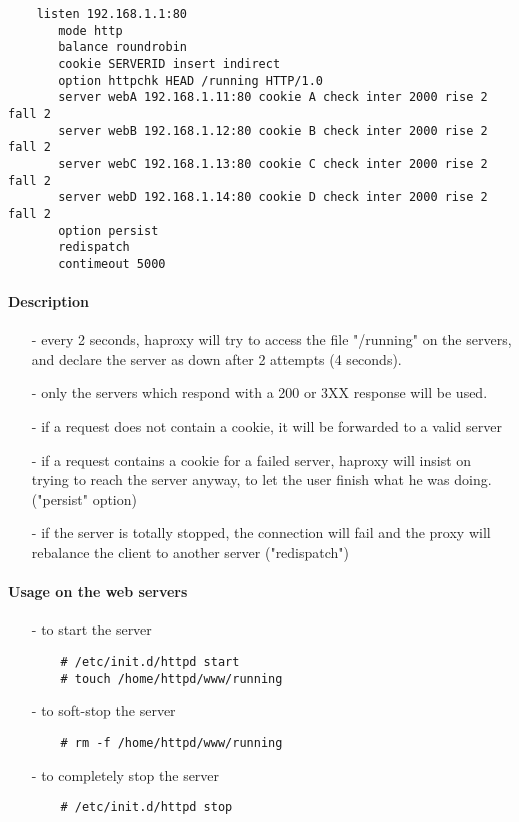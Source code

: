 \begin{verbatim}       
    listen 192.168.1.1:80
       mode http
       balance roundrobin
       cookie SERVERID insert indirect
       option httpchk HEAD /running HTTP/1.0
       server webA 192.168.1.11:80 cookie A check inter 2000 rise 2 fall 2
       server webB 192.168.1.12:80 cookie B check inter 2000 rise 2 fall 2
       server webC 192.168.1.13:80 cookie C check inter 2000 rise 2 fall 2
       server webD 192.168.1.14:80 cookie D check inter 2000 rise 2 fall 2
       option persist
       redispatch
       contimeout 5000
\end{verbatim}

\paragraph{Description}

\begin{itemize}
\item[-] every 2 seconds, haproxy will try to access the file "/running" on the
   servers, and declare the server as down after 2 attempts (4 seconds).
\item[-] only the servers which respond with a 200 or 3XX response will be used.
\item[-] if a request does not contain a cookie, it will be forwarded to a valid
   server
\item[-] if a request contains a cookie for a failed server, haproxy will insist
   on trying to reach the server anyway, to let the user finish what he was
   doing. ("persist" option)
\item[-] if the server is totally stopped, the connection will fail and the proxy
   will rebalance the client to another server ("redispatch")
\end{itemize}

\paragraph{Usage on the web servers}

\begin{itemize}
\item[-] to start the server
\begin{verbatim}
    # /etc/init.d/httpd start
    # touch /home/httpd/www/running
\end{verbatim}
\item[-] to soft-stop the server
\begin{verbatim}
    # rm -f /home/httpd/www/running
\end{verbatim}
\item[-] to completely stop the server
\begin{verbatim}
    # /etc/init.d/httpd stop
\end{verbatim}
\end{itemize}

